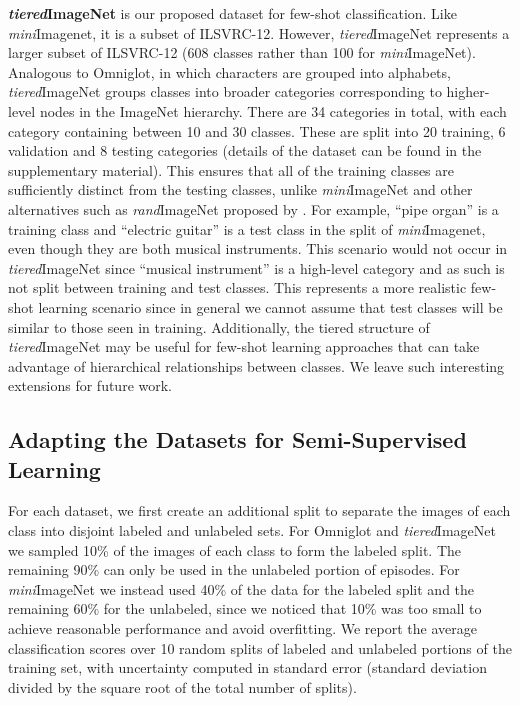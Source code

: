 \textbf{\textit{tiered}ImageNet} is our proposed dataset for few-shot classification. Like
\textit{mini}Imagenet, it is a subset of ILSVRC-12. However, \textit{tiered}ImageNet represents a
larger subset of ILSVRC-12 (608 classes rather than 100 for \textit{mini}ImageNet). Analogous to
Omniglot, in which characters are grouped into alphabets, \textit{tiered}ImageNet groups classes
into broader categories corresponding to higher-level nodes in the ImageNet \citep{deng2009imagenet}
hierarchy. There are 34 categories in total, with each category containing between 10 and 30
classes. These are split into 20 training, 6 validation and 8 testing categories (details of the
dataset can be found in the supplementary material). This ensures that all of the training classes
are sufficiently distinct from the testing classes, unlike \textit{mini}ImageNet and other
alternatives such as \textit{rand}ImageNet proposed by  \citet{vinyals2016matchingnet}. For example,
``pipe organ'' is a training class and ``electric guitar'' is a test class in the
\citet{ravi2017oneshot} split of  \textit{mini}Imagenet, even though they are both musical
instruments. This scenario would not occur in \textit{tiered}ImageNet since ``musical instrument''
is a high-level category and as such is not split between training and test classes. This represents
a more realistic few-shot learning scenario since in general we cannot assume that test classes will
be similar to those seen in training. Additionally, the tiered structure of \textit{tiered}ImageNet
may be useful for few-shot learning approaches that can take advantage of hierarchical relationships
between classes. We leave such interesting extensions for future work.

\subsection{Adapting the Datasets for Semi-Supervised Learning}
For each dataset, we first create an additional split to separate the images of each class into
disjoint labeled and unlabeled sets. For Omniglot and {\it tiered}ImageNet we sampled 10\% of the
images of each class to form the labeled split. The remaining 90\% can only be used in the unlabeled
portion of episodes. For {\it mini}ImageNet we instead used 40\% of the data for the labeled split
and the remaining 60\% for the unlabeled, since we noticed that 10\% was too small to achieve
reasonable performance and avoid overfitting. We report the average classification scores over 10
random splits of labeled and unlabeled portions of the training set, with uncertainty computed in
standard error (standard deviation divided by the square root of the total number of splits).

